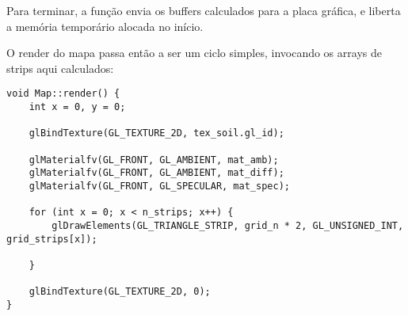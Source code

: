Para terminar, a função envia os buffers calculados para a placa gráfica, e liberta a memória temporário alocada no início.

O render do mapa passa então a ser um ciclo simples, invocando os arrays de strips aqui calculados:

\begin{lstlisting}[caption=Render do mapa com VBOs]
void Map::render() {
	int x = 0, y = 0;

	glBindTexture(GL_TEXTURE_2D, tex_soil.gl_id);

	glMaterialfv(GL_FRONT, GL_AMBIENT, mat_amb);
	glMaterialfv(GL_FRONT, GL_AMBIENT, mat_diff);
	glMaterialfv(GL_FRONT, GL_SPECULAR, mat_spec);

	for (int x = 0; x < n_strips; x++) {
		glDrawElements(GL_TRIANGLE_STRIP, grid_n * 2, GL_UNSIGNED_INT, grid_strips[x]);

	}

	glBindTexture(GL_TEXTURE_2D, 0);
}
\end{lstlisting}
